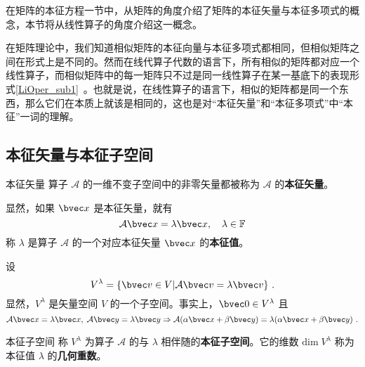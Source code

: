 在矩阵的本征方程一节中，从矩阵的角度介绍了矩阵的本征矢量与本征多项式的概念，本节将从线性算子的角度介绍这一概念。

在矩阵理论中，我们知道相似矩阵的本征向量与本征多项式都相同，但相似矩阵之间在形式上是不同的。然而在线代算子代数的语言下，所有相似的矩阵都对应一个线性算子，而相似矩阵中的每一矩阵只不过是同一线性算子在某一基底下的表现形式\autoref{LiOper_sub1}~。也就是说，在线性算子的语言下，相似的矩阵都是同一个东西，那么它们在本质上就该是相同的，这也是对“本征矢量”和“本征多项式”中“本征”一词的理解。

\subsection{本征矢量与本征子空间}
\begin{definition}{本征矢量}
算子 $\mathcal{A}$ 的一维不变子空间中的非零矢量都被称为 $\mathcal{A}$ 的\textbf{本征矢量}。
\end{definition}
显然，如果 $\bvec x$ 是本征矢量，就有
\begin{equation}\label{EigVM_eq1}
\mathcal{A}\bvec x=\lambda \bvec x,\quad \lambda\in\mathbb{F}
\end{equation}
称 $\lambda$ 是算子 $\mathcal{A}$ 的一个对应本征矢量 $\bvec x$ 的\textbf{本征值}。

设
\begin{equation}
V^{\lambda}=\{\bvec v\in V|\mathcal{A}\bvec v=\lambda \bvec v\}~.
\end{equation}
显然，$V^{\lambda}$ 是矢量空间 $V$ 的一个子空间。事实上，$\bvec 0\in V^{\lambda}$ 且
\begin{equation}
\mathcal{A}\bvec x=\lambda \bvec x,\;\mathcal{A}\bvec y=\lambda \bvec y\Rightarrow\mathcal{A}(\alpha\bvec x+\beta\bvec y)=\lambda(\alpha\bvec x+\beta \bvec y)~.
\end{equation}
\begin{definition}{本征子空间}\label{EigVM_def1}
称 $V^{\lambda}$ 为算子 $\mathcal{A}$ 的与 $\lambda$ 相伴随的\textbf{本征子空间}。它的维数 $\mathrm{dim}\;V^{\lambda}$ 称为本征值 $\lambda$ 的\textbf{几何重数}。 
\end{definition}
